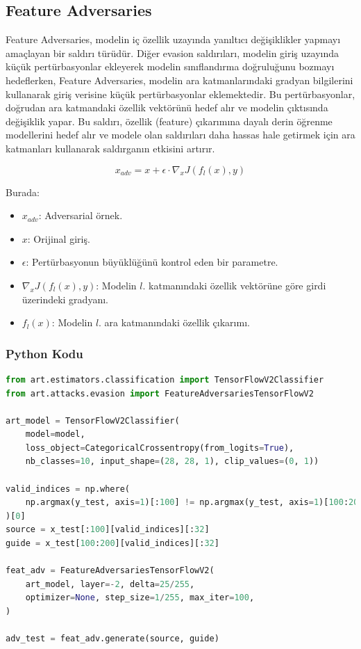 \newpage

\subsection{Feature Adversaries}

Feature Adversaries, modelin iç özellik uzayında yanıltıcı değişiklikler yapmayı amaçlayan bir saldırı türüdür. Diğer evasion saldırıları, modelin giriş uzayında küçük pertürbasyonlar ekleyerek modelin sınıflandırma doğruluğunu bozmayı hedeflerken, Feature Adversaries, modelin ara katmanlarındaki gradyan bilgilerini kullanarak giriş verisine küçük pertürbasyonlar eklemektedir. Bu pertürbasyonlar, doğrudan ara katmandaki özellik vektörünü hedef alır ve modelin çıktısında değişiklik yapar. Bu saldırı, özellik (feature) çıkarımına dayalı derin öğrenme modellerini hedef alır ve modele olan saldırıları daha hassas hale getirmek için ara katmanları kullanarak saldırganın etkisini artırır.

\[ x_{adv} = x + \epsilon \cdot \nabla_x J(f_l(x), y) \]

Burada:

\begin{itemize}
    \item $x_{adv}$: Adversarial örnek.
    \item $x$: Orijinal giriş.
    \item $\epsilon$: Pertürbasyonun büyüklüğünü kontrol eden bir parametre.
    \item $\nabla_x J(f_l(x), y)$: Modelin $l$. katmanındaki özellik vektörüne göre girdi üzerindeki gradyanı.
    \item $f_l(x)$: Modelin $l$. ara katmanındaki özellik çıkarımı.
\end{itemize}

\subsubsection{Python Kodu}

\begin{lstlisting}[language=Python]
from art.estimators.classification import TensorFlowV2Classifier
from art.attacks.evasion import FeatureAdversariesTensorFlowV2

art_model = TensorFlowV2Classifier(
    model=model, 
    loss_object=CategoricalCrossentropy(from_logits=True), 
    nb_classes=10, input_shape=(28, 28, 1), clip_values=(0, 1))

valid_indices = np.where(
    np.argmax(y_test, axis=1)[:100] != np.argmax(y_test, axis=1)[100:200]
)[0]
source = x_test[:100][valid_indices][:32]
guide = x_test[100:200][valid_indices][:32]

feat_adv = FeatureAdversariesTensorFlowV2(
    art_model, layer=-2, delta=25/255,
    optimizer=None, step_size=1/255, max_iter=100,
)

adv_test = feat_adv.generate(source, guide)
\end{lstlisting}

